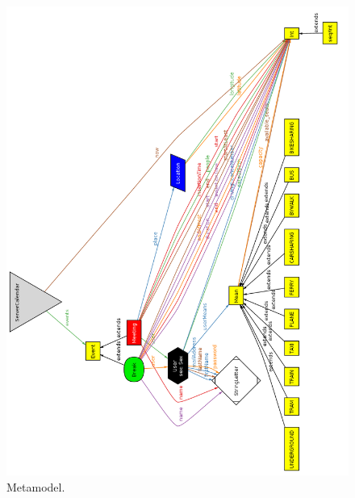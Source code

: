 \documentclass{article}
\begin{document}
	\begin{figure}[h!]
		\bigskip
		\centering
		\includegraphics[scale=0.5]{img/diagrams/mm.png}
		\caption{Metamodel.}
	\end{figure}
\end{document}
